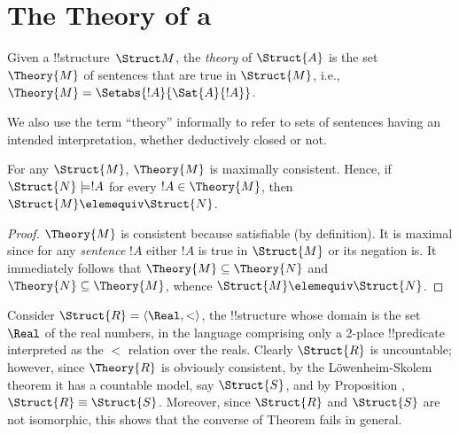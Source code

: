 \documentclass[../../include/open-logic-section]{subfiles}
\begin{document}
\section{The Theory of a }

\begin{defn} 
  Given a !!{structure}~$\Struct M$, the \emph{theory} of
  $\Struct{A}$ is the set $\Theory{M}$ of sentences
  that are true in $\Struct{M}$, i.e., $\Theory{M} =
  \Setabs{!A}{\Sat{A}{!A}}$.
\end{defn}

We also use the term ``theory'' informally to refer to sets
of sentences having an intended interpretation, whether deductively
closed or not.

\begin{prop}
  For any $\Struct{M}$,  $\Theory{M}$ is maximally
  consistent. Hence, if $\Struct{N} \models !A$ for every $!A
  \in \Theory{M}$, then $\Struct{M} \elemequiv
  \Struct{N}$. 
\end{prop}

\begin{proof}
  $\Theory{M}$ is consistent because satisfiable (by definition). It
  is maximal since for any \emph{sentence} $!A$ either $!A$ is true in
  $\Struct{M}$ or its negation is. It immediately follows that
  $\Theory{M} \subseteq \Theory{N}$ and $\Theory{N} \subseteq
  \Theory{M}$, whence $\Struct{M} \elemequiv \Struct{N}$.
\end{proof}

\begin{rem}
  Consider $\Struct{R} = \langle\Real, <\rangle$, the !!{structure}
  whose domain is the set $\Real$ of the real numbers, in the language
  comprising only a 2-place !!{predicate} interpreted as the $<$ relation
  over the reals. Clearly $\Struct{R}$ is uncountable; however, since
  $\Theory{R}$ is obviously consistent, by the L\"owenheim-Skolem
  theorem it has a countable model, say $\Struct{S}$, and by
  Proposition , $\Struct{R} \equiv
  \Struct{S}$. Moreover, since $\Struct{R}$ and $\Struct{S}$ are not
  isomorphic, this shows that the converse of Theorem 
  fails in general.
\end{rem}
\end{document}
